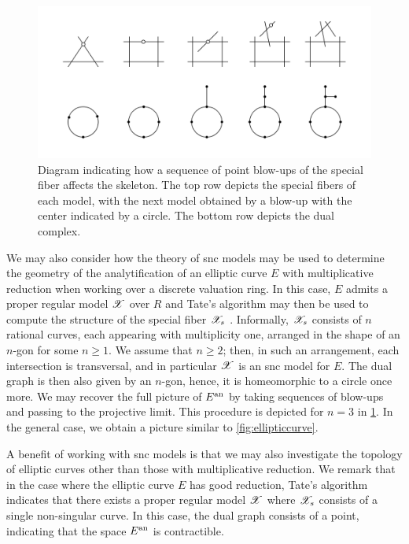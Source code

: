 \begin{figure}[!ht]
    \centering
    \includegraphics[width=1.0\textwidth]{Images/projectivelimit.png}
    \caption{Diagram indicating how a sequence of point blow-ups of the special fiber affects the skeleton.
    The top row depicts the special fibers of each model, with the next model obtained by a blow-up with the center indicated by a circle.
    The bottom row depicts the dual complex.}
    \label{sequenceofpointblowups}
\end{figure}

We may also consider how the theory of snc models may be used to determine the geometry of the analytification of an elliptic curve $E$ with multiplicative reduction when working over a discrete valuation ring.
In this case, $E$ admits a proper regular model $\mathscr{X}$ over $R$ and
Tate's algorithm may then be used to compute the structure of the special fiber $\mathscr{X}_s$ \parencite[\S IV.9, Theorem 8.2]{silverman}.
Informally, $\mathscr{X}_s$ consists of $n$ rational curves, each appearing with multiplicity one, arranged in the shape of an $n$-gon for some $n \geq 1$.
We assume that $n \geq 2$; then, in such an arrangement, each intersection is transversal, and in particular $\mathscr{X}$ is an snc model for $E$.
The dual graph is then also given by an $n$-gon, hence, it is homeomorphic to a circle once more.
We may recover the full picture of $E^{\text{an}}$ by taking sequences of blow-ups and passing to the projective limit.
This procedure is depicted for $n = 3$ in \cref{sequenceofpointblowups}.
In the general case, we obtain a picture similar to \cref{fig:ellipticcurve}.

A benefit of working with snc models is that we may also investigate the topology of elliptic curves other than those with multiplicative reduction.
We remark that in the case where the elliptic curve $E$ has good reduction, Tate's algorithm indicates that there exists a proper regular model $\mathscr{X}$ where $\mathscr{X}_s$ consists of a single non-singular curve. 
In this case, the dual graph consists of a point, indicating that the space $E^{\text{an}}$ is contractible.
